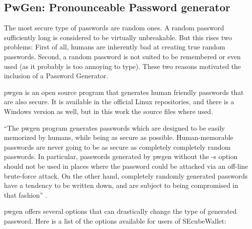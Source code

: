 \subsection{PwGen: Pronounceable Password generator}

The most secure type of passwords are random ones. A random password sufficiently long is considered to be virtually unbreakable. But this rises two problems: First of all, humans are inherently bad at creating true random passwords. Second, a random password is not suited to be remembered or even used (as it probably is too annoying to type). These two reasons motivated the inclusion of a Password Generator.

pwgen is an open source program that generates human friendly passwords that are also secure. It is available in the official Linux repositories, and there is a Windows version as well, but in this work the source files where used.

``The pwgen program generates passwords which are designed to be easily memorized by humans, while being as secure as possible. Human-memorable passwords are never going to be as secure as completely completely random passwords. In particular, passwords generated by pwgen without the -s option should not be used in places where the password could be attacked via an off-line brute-force attack. On the other hand, completely randomly generated passwords have a tendency to be written down, and are subject to being compromised in that fashion'' \cite{pwgen}.

pwgen offers several options that can drastically change the type of generated password. Here is a list of the options available for users of SEcubeWallet:

